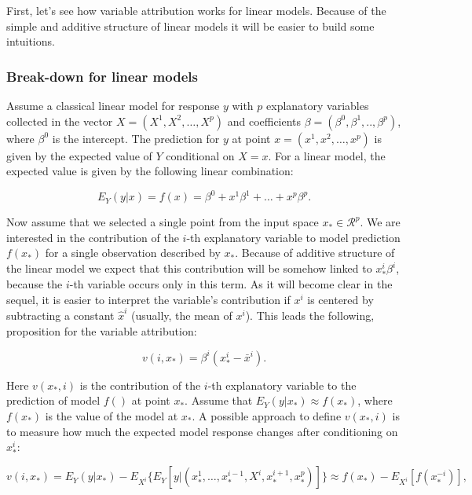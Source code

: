 \documentclass[12pt,]{krantz}
\begin{document}
First, let's see how variable attribution works for linear models. Because of the simple and additive structure of linear models it will be easier to build some intuitions.

\hypertarget{break-down-for-linear-models}{%
\subsubsection{Break-down for linear models}\label{break-down-for-linear-models}}

Assume a classical linear model for response \(y\) with \(p\) explanatory variables collected in the vector \(X = (X^1, X^2, \ldots, X^p)\) and coefficients \(\beta = (\beta^0, \beta^1, .., \beta^p)\), where \(\beta^0\) is the intercept. The prediction for \(y\) at point \(x=(x^1, x^2, \ldots, x^p)\) is given by the expected value of \(Y\) conditional on \(X=x\). For a linear model, the expected value is given by the following linear combination:

\[
E_Y(y | x) = f(x) = \beta^0 + x^1 \beta^1 + \ldots + x^p \beta^p.
\]

Now assume that we selected a single point from the input space \(x_* \in \mathcal R^p\).
We are interested in the contribution of the \(i\)-th explanatory variable to model prediction \(f(x_*)\) for a single observation described by \(x_*\). Because of additive structure of the linear model we expect that this contribution will be somehow linked to \(x_*^i\beta^i\), because the \(i\)-th variable occurs only in this term. As it will become clear in the sequel, it is easier to interpret the variable's contribution if \(x^i\) is centered by subtracting a constant \(\hat x^i\) (usually, the mean of \(x^i\)). This leads the following, proposition for the variable attribution:

\begin{equation}
v(i, x_*) = \beta^i (x^i_* - \bar x^i).
\label{eq:singleBreakDownContribution}
\end{equation}

Here \(v(x_*, i)\) is the contribution of the \(i\)-th explanatory variable to the prediction of model \(f()\) at point \(x_*\). Assume that \(E_Y(y | x_*) \approx f(x_*)\), where \(f(x_*)\) is the value of the model at \(x_*\). A possible approach to define \(v(x_*, i)\) is to measure how much the expected model response changes after conditioning on \(x^i_*\):

\begin{equation}
v(i, x_*) = E_Y(y | x_*) - E_{X^i}\{E_Y[y | (x^1_*,\ldots,x^{i-1}_*,X^i,x^{i+1}_*,x^p_*)]\}\approx f(x_*) - E_{X^i}[f(x^{-i}_*)],
\end{equation}
\end{document}
